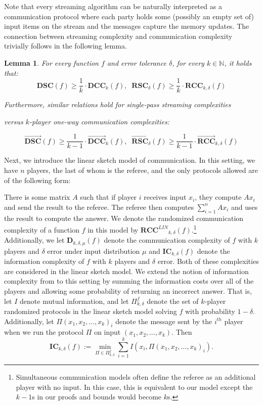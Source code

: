 \documentclass[11pt]{article}
\numberwithin{equation}{section}
\newtheorem{lemma}[theorem]{Lemma}
\theoremstyle{definition}
\theoremstyle{plain}
\newcommand{\N}{\mathbb N}
\newcommand{\error}{\ensuremath{\delta}}
\newcommand{\eqdef}{\ensuremath{:=}}
\newcommand{\dcc}{\ensuremath{\mathbf{DCC}}}
\newcommand{\rcc}{\ensuremath{\mathbf{RCC}}}
\newcommand{\dsc}{\ensuremath{\mathbf{DSC}}}
\newcommand{\rsc}{\ensuremath{\mathbf{RSC}}}
\newcommand{\ic}{\ensuremath{\mathbf{IC}}}
\newcommand{\dccone}{\ensuremath{\overrightarrow{\mathbf{DCC}}}}
\newcommand{\rccone}{\ensuremath{\overrightarrow{\mathbf{RCC}}}}
\newcommand{\dscone}{\ensuremath{\overrightarrow{\mathbf{DSC}}}}
\newcommand{\rscone}{\ensuremath{\overrightarrow{\mathbf{RSC}}}}
\newcommand{\rcclin}{\ensuremath{\mathbf{RCC}^{LIN}}}
\newcommand{\D}{\ensuremath{\mathbf{D}}}
\begin{document}
Note that every streaming algorithm can be naturally interpreted as a communication protocol where each party holds some (possibly an empty set of) input items on the stream and the messages capture the memory updates.
The connection between streaming complexity and communication complexity trivially follows 
in the following lemma.

\begin{lemma}\label{lemma:sc-cc}
For every function $f$ and error tolerance $\error$, 
for every $k\in\N$, it holds that: 
\[\dsc(f)\ge \frac{1}{k} \cdot \dcc_{k}(f),\;\;
\rsc_{\error}(f)\ge \frac{1}{k} \cdot \rcc_{k,\error}(f)\]

Furthermore, similar relations hold for 
 single-pass streaming complexities 

versus
 $k$-player one-way communication complexities: 

\[\dscone(f)\ge \frac{1}{k-1} \cdot \dccone_{k}(f),\;\;
\rscone_{\error}(f)\ge \frac{1}{k-1} \cdot \rccone_{k,\error}(f)\]

\end{lemma}

Next, we introduce the linear sketch model of communication. In this setting, we have $n$ players, {\color{black}the last of whom is the referee,} and the only protocols allowed are of the following form:

There is some matrix $A$ such that if player $i$ receives input $x_i$, they compute $Ax_i$ and send the result to the referee. The referee then computes $\sum_{i=1}^n Ax_i$ and uses the result to compute the answer. We denote the randomized communication complexity of a function $f$ in this model by $\rcclin_{k,\delta}(f)$.\footnote{Simultaneous communication models often define the referee as an additional player with no input. In this case, this is equivalent to our model except the $k-1$s in our proofs and bounds would become $k$s.}\\

Additionally, we let $\D_{k,\delta,\mu}(f)$ denote the communication complexity of $f$ with $k$ players and $\delta$ error under input distribution $\mu$ and $\ic_{k,\delta}(f)$ denote the information complexity of $f$ with $k$ players and $\delta$ error. {\color{black}Both of these complexities are considered in the linear sketch model.} We extend the notion of information complexity from \cite{959901} to this setting by summing the information costs over all of the players and allowing some probability of returning an incorrect answer. {\color{black}That is, let $I$ denote mutual information, and let $\Pi^{f}_{k,\delta}$ denote the set of $k$-player randomized protocols in the linear sketch model solving $f$ with probability $1-\delta$. Additionally, let $\Pi(x_1, x_2, \dots, x_k)_i$ denote the message sent by the $i^{th}$ player when we run the protocol $\Pi$ on input $(x_1, x_2, \dots, x_k)$. Then
$$\ic_{k,\delta}(f) \eqdef \min_{\Pi \in \Pi^f_{k,\delta}} \sum_{i=1}^k I\left(x_i, \Pi(x_1, x_2, \dots, x_k)_i\right).$$}
\end{document}

